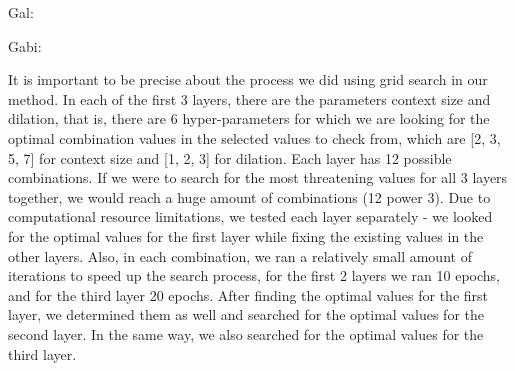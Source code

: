 \documentclass[a4paper]{article}
\begin{document}
Gal:

\begin{table}[ht]
\centering
\caption{Grid Search: layer 2 results}
\label{tab:Languages}
\end{table}

Gabi:

It is important to be precise about the process we did using grid search in our method. In each of the first 3 layers, there are the parameters context size and dilation, that is, there are 6 hyper-parameters for which we are looking for the optimal combination values in the selected values to check from, which are [2, 3, 5, 7] for context size and [1, 2, 3] for dilation. Each layer has 12 possible combinations. If we were to search for the most threatening values for all 3 layers together, we would reach a huge amount of combinations (12 power 3). Due to computational resource limitations, we tested each layer separately - we looked for the optimal values for the first layer while fixing the existing values in the other layers. Also, in each combination, we ran a relatively small amount of iterations to speed up the search process, for the first 2 layers we ran 10 epochs, and for the third layer 20 epochs. After finding the optimal values for the first layer, we determined them as well and searched for the optimal values for the second layer. In the same way, we also searched for the optimal values for the third layer.
\end{document}
